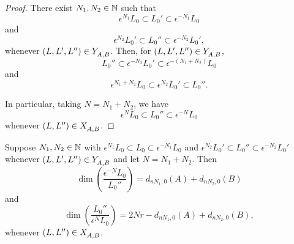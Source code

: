 \documentclass[a4paper, 11pt]{report}
\begin{document}
\begin{proof}
There exist $N_1,N_2\in\mathbb{N}$ such that
\begin{equation*}
\epsilon^{N_1}L_0\subset L_0'\subset \epsilon^{-N_1}L_0
\end{equation*}
and
\begin{equation*}
\epsilon^{N_2}L_0'\subset L_0''\subset \epsilon^{-N_2}L_0',
\end{equation*}
whenever $(L,L',L'')\in Y_{A,B}^{}$. Then, for $(L,L',L'')\in Y_{A,B}^{}$,
\begin{equation*}
L_0''\subset \epsilon^{-N_2} L_0' \subset \epsilon^{-(N_1+N_2)} L_0
\end{equation*}
and
\begin{equation*}
\epsilon^{N_1+N_2}L_0\subset \epsilon^{N_2}L_0'\subset L_0''.
\end{equation*}

In particular, taking $N=N_1 + N_2$, we have
\begin{equation*}
\epsilon^N L_0 \subset L_0'' \subset \epsilon^{-N}L_0
\end{equation*}
whenever $(L,L'')\in X_{A,B}^{}$.
\end{proof}

\begin{lemma}\label{lemma:codimensions-in-orbit-product}
Suppose $N_1,N_2\in\mathbb{N}$ with $\epsilon^{N_1}L_0\subset L_0\subset \epsilon^{-N_1}L_0$ and $\epsilon^{N_2}L_0'\subset L_0''\subset \epsilon^{-N_2}L_0'$ whenever $(L,L',L'')\in Y_{A,B}^{}$ and let $N = N_1 + N_2$. Then
\begin{equation*}
\dim\left(\frac{\epsilon^{-N}L_0}{L_0''}\right) = d_{nN_1,0}(A) + d_{nN_2,0}(B)
\end{equation*}
and
\begin{equation*}
\dim\left(\frac{L_0''}{\epsilon^N L_0}\right) = 2Nr - d_{nN_1,0}(A) + d_{nN_2,0}(B),
\end{equation*}
whenever $(L,L'')\in X_{A,B}^{}$.
\end{lemma}
\end{document}
